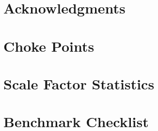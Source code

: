 \documentclass{ldbc}
\begin{document}
\maketitle

\chapter*{Acknowledgments}





















\appendix

\chapter{Choke Points}



\chapter{Scale Factor Statistics}



\chapter{Benchmark Checklist}


\end{document}
